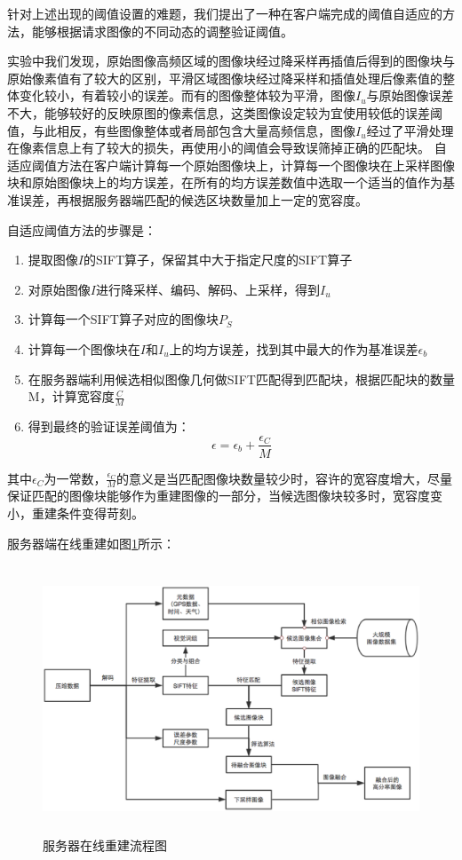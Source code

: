 \documentclass[UTF8]{csoarticle}
\begin{document}
针对上述出现的阈值设置的难题，我们提出了一种在客户端完成的阈值自适应的方法，能够根据请求图像的不同动态的调整验证阈值。

实验中我们发现，原始图像高频区域的图像块经过降采样再插值后得到的图像块与原始像素值有了较大的区别，平滑区域图像块经过降采样和插值处理后像素值的整体变化较小，有着较小的误差。而有的图像整体较为平滑，图像\(I_u\)与原始图像误差不大，能够较好的反映原图的像素信息，这类图像设定较为宜使用较低的误差阈值，与此相反，有些图像整体或者局部包含大量高频信息，图像\(I_u\)经过了平滑处理在像素信息上有了较大的损失，再使用小的阈值会导致误筛掉正确的匹配块。
自适应阈值方法在客户端计算每一个原始图像块上，计算每一个图像块在上采样图像块和原始图像块上的均方误差，在所有的均方误差数值中选取一个适当的值作为基准误差，再根据服务器端匹配的候选区块数量加上一定的宽容度。

自适应阈值方法的步骤是：
\begin{enumerate}
\item 提取图像\(I\)的SIFT算子，保留其中大于指定尺度的SIFT算子
\item 对原始图像\(I\)进行降采样、编码、解码、上采样，得到\(I_u\)
\item 计算每一个SIFT算子对应的图像块\(P_S\)
\item 计算每一个图像块在\(I\)和\(I_u\)上的均方误差，找到其中最大的作为基准误差\(\epsilon_b\)
\item 在服务器端利用候选相似图像几何做SIFT匹配得到匹配块，根据匹配块的数量M，计算宽容度\(\frac{C}{M}\)
\item 得到最终的验证误差阈值为：
\begin{equation}
\epsilon = \epsilon_b + \frac{\epsilon_C}{M}
\end{equation}
\end{enumerate}

其中\(\epsilon_C\)为一常数，\(\frac{\epsilon_C}{M}\)的意义是当匹配图像块数量较少时，容许的宽容度增大，尽量保证匹配的图像块能够作为重建图像的一部分，当候选图像块较多时，宽容度变小，重建条件变得苛刻。

服务器端在线重建如图\ref{fig:serverOnline}所示：
\begin{figure}
\centering\includegraphics[height=8cm]{serverOnline}
\caption{服务器在线重建流程图}
\label{fig:serverOnline}
\end{figure}
\end{document}
